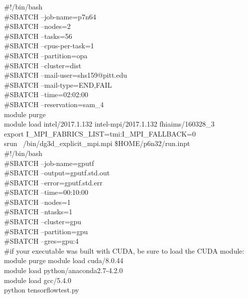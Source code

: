\documentclass[landscape,a0paper,fontscale=0.285]{baposter} %
\begin{document}
\begin{poster}
{\colorbox[HTML]{cdb87d}{}
\#!/bin/bash\\
\#SBATCH –job-name=p7n64\\
\#SBATCH --nodes=2\\
\#SBATCH --tasks=56\\
\#SBATCH --cpus-per-task=1\\
\#SBATCH --partition=opa\\
\#SBATCH --cluster=dist\\
\#SBATCH --mail-user=shs159@pitt.edu\\
\#SBATCH --mail-type=END,FAIL\\
\#SBATCH --time=02:02:00\\
\#SBATCH --reservation=sam\_4\\
module purge\\
module load intel/2017.1.132 intel-mpi/2017.1.132 fhiaims/160328\_3\\
export I\_MPI\_FABRICS\_LIST=tmi:I\_MPI\_FALLBACK=0\\
srun ~/bin/dg3d\_explicit\_mpi.mpi \$HOME/p6n32/run.inpt\\

\colorbox[HTML]{cdb87d}{}
\#!/bin/bash \\
\#SBATCH --job-name=gputf\\
\#SBATCH --output=gputf.std.out\\
\#SBATCH --error=gputf.std.err\\
\#SBATCH --time=00:10:00\\
\#SBATCH --nodes=1\\
\#SBATCH --ntasks=1\\
\#SBATCH --cluster=gpu\\             
\#SBATCH --partition=gpu\\             
\#SBATCH --gres=gpu:4\\
\#if your executable was built with CUDA, be sure to load the CUDA module:\\
module purge
module load cuda/8.0.44\\
module load python/anaconda2.7-4.2.0\\
module load gcc/5.4.0\\
python tensorflowtest.py
}


\end{poster}
\end{document}
